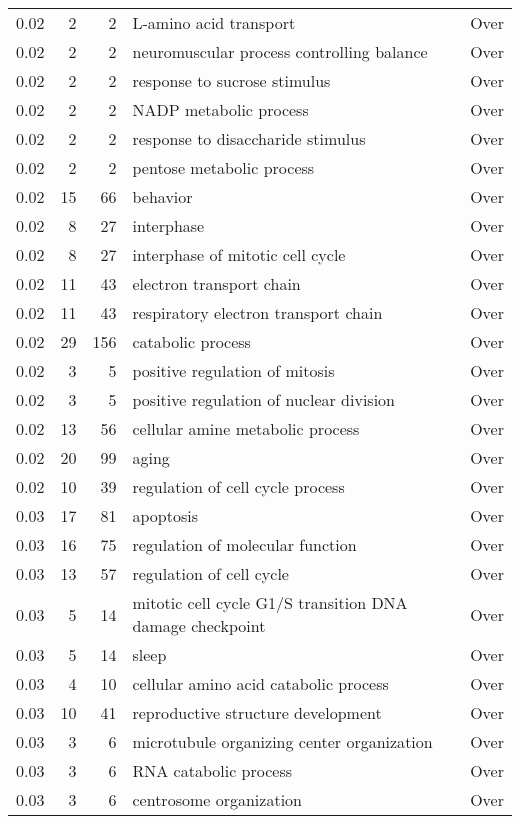 \documentclass[10pt]{bmc_article}
\newenvironment{bmcformat}{\begin{raggedright}\baselineskip20pt\sloppy\setboolean{publ}{false}}{\end{raggedright}\baselineskip20pt\sloppy}
\begin{document}
\begin{bmcformat}
\begin{longtable}{rrrp{7cm}r}
  0.02 &   2 &   2 & L-amino acid transport & Over \\ 
  0.02 &   2 &   2 & neuromuscular process controlling balance & Over \\ 
  0.02 &   2 &   2 & response to sucrose stimulus & Over \\ 
  0.02 &   2 &   2 & NADP metabolic process & Over \\ 
  0.02 &   2 &   2 & response to disaccharide stimulus & Over \\ 
  0.02 &   2 &   2 & pentose metabolic process & Over \\ 
  0.02 &  15 &  66 & behavior & Over \\ 
  0.02 &   8 &  27 & interphase & Over \\ 
  0.02 &   8 &  27 & interphase of mitotic cell cycle & Over \\ 
  0.02 &  11 &  43 & electron transport chain & Over \\ 
  0.02 &  11 &  43 & respiratory electron transport chain & Over \\ 
  0.02 &  29 & 156 & catabolic process & Over \\ 
  0.02 &   3 &   5 & positive regulation of mitosis & Over \\ 
  0.02 &   3 &   5 & positive regulation of nuclear division & Over \\ 
  0.02 &  13 &  56 & cellular amine metabolic process & Over \\ 
  0.02 &  20 &  99 & aging & Over \\ 
  0.02 &  10 &  39 & regulation of cell cycle process & Over \\ 
  0.03 &  17 &  81 & apoptosis & Over \\ 
  0.03 &  16 &  75 & regulation of molecular function & Over \\ 
  0.03 &  13 &  57 & regulation of cell cycle & Over \\ 
  0.03 &   5 &  14 & mitotic cell cycle G1/S transition DNA damage checkpoint & Over \\ 
  0.03 &   5 &  14 & sleep & Over \\ 
  0.03 &   4 &  10 & cellular amino acid catabolic process & Over \\ 
  0.03 &  10 &  41 & reproductive structure development & Over \\ 
  0.03 &   3 &   6 & microtubule organizing center organization & Over \\ 
  0.03 &   3 &   6 & RNA catabolic process & Over \\ 
  0.03 &   3 &   6 & centrosome organization & Over \\ 

\end{longtable}
\end{bmcformat}
\end{document}
